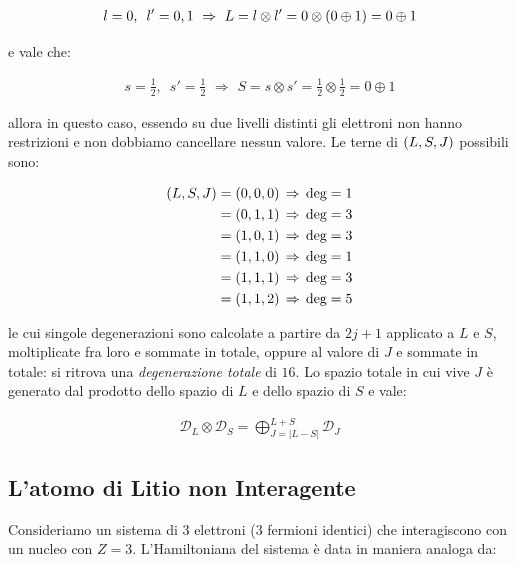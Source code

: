 \begin{itemize}
	\begin{align*}
		l = 0, \,\,\, l' = 0, 1 \,\, \Rightarrow \,\, L = l \otimes l' = 0 \otimes \qty( 0 \oplus 1) = 0 \oplus 1 
	\end{align*}
		
		e vale che:

	\begin{align*}
		s = \frac{1}{2}, \,\,\, s' = \frac{1}{2} \,\, \Rightarrow \,\, S = s \otimes s' = \frac{1}{2} \otimes \frac{1}{2} = 0 \oplus 1 
	\end{align*}

		allora in questo caso, essendo su due livelli distinti gli elettroni non hanno restrizioni e non dobbiamo cancellare nessun valore. Le terne di $\qty(L, S, J)$ possibili sono:
		
	\begin{align*}
		\qty(L, S, J) & = \qty(0, 0, 0) \, \Rightarrow \, \text{deg} = 1 \\
		& = \qty(0, 1, 1) \, \Rightarrow \, \text{deg} = 3 \\
		& = \qty(1, 0, 1) \, \Rightarrow \, \text{deg} = 3 \\
		& = \qty(1, 1, 0) \, \Rightarrow \, \text{deg} = 1 \\
		& = \qty(1, 1, 1) \, \Rightarrow \, \text{deg} = 3 \\
		& = \qty(1, 1, 2) \, \Rightarrow \, \text{deg} = 5 \\
	\end{align*}
	
		le cui singole degenerazioni sono calcolate a partire da $2j + 1 $ applicato a $L$ e $S$, moltiplicate fra loro e sommate in totale, oppure al valore di $J$ e sommate in totale: si ritrova una \textit{degenerazione totale} di $16$. Lo spazio totale in cui vive $J$ è generato dal prodotto dello spazio di $L$ e dello spazio di $S$ e vale:
		
	\begin{align*}
		\mathcal{D}_L \otimes \mathcal{D}_S = \bigoplus_{J = |L - S|}^{L + S} \mathcal{D}_J
	\end{align*}

\end{itemize}

\subsection{L'atomo di Litio non Interagente}
	
	Consideriamo un sistema di $3$ elettroni ($3$ fermioni identici) che interagiscono con un nucleo con $Z = 3$. L'Hamiltoniana del sistema è data in maniera analoga da:
	
